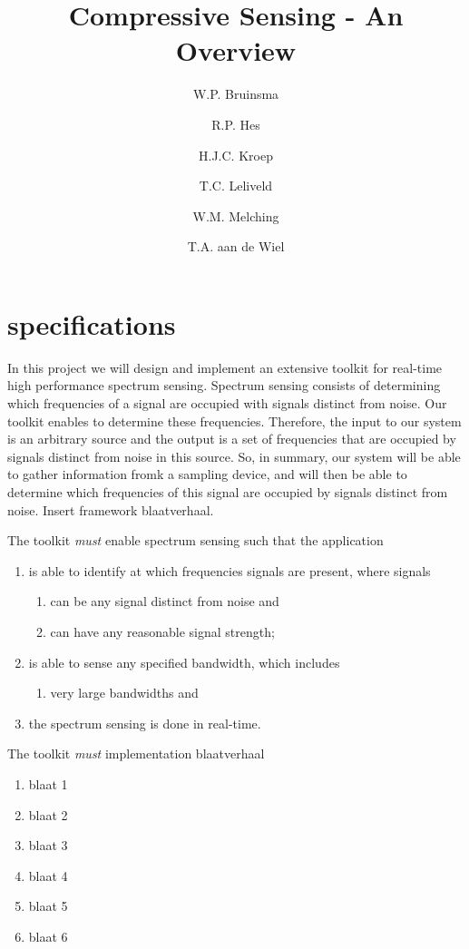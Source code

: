 \documentclass[a4paper, openany, oneside]{memoir}
\title{Compressive Sensing - An Overview}
\author{W.P. Bruinsma \and R.P. Hes \and H.J.C. Kroep \and T.C. Leliveld \and W.M. Melching \and T.A. aan de Wiel}
\begin{document}
\section{specifications}
In this project we will design and implement an extensive toolkit for real-time high performance spectrum sensing. 
Spectrum sensing consists of determining which frequencies of a signal are occupied with signals distinct from noise. Our toolkit enables to determine these frequencies. Therefore, the input to our system is an arbitrary source and the output is a set of frequencies that are occupied by signals distinct from noise in this source. So, in summary, our system will be able to gather information fromk a sampling device, and will then be able to determine which frequencies of this signal are occupied by signals distinct from noise. Insert framework blaatverhaal. 

The toolkit \emph{must} enable spectrum sensing such that the application
\begin{enumerate}
    \item is able to identify at which frequencies signals are present, where signals
    \begin{enumerate}
        \item can be any signal distinct from noise and
        \item can have any reasonable signal strength;
    \end{enumerate}
    \item is able to sense any specified bandwidth, which includes
    \begin{enumerate}
        \item very large bandwidths and
    \end{enumerate}
    \item the spectrum sensing is done in real-time.
\end{enumerate}


The toolkit \emph{must} implementation blaatverhaal 
\begin{enumerate}
    \item blaat 1
    \item blaat 2
    \item blaat 3
    \item blaat 4
    \item blaat 5
    \item blaat 6
\end{enumerate}
\end{document}
